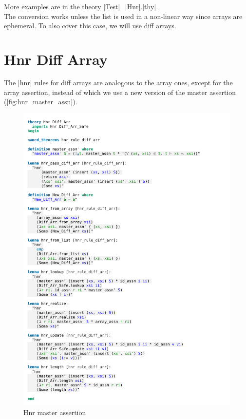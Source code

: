 \noindent More examples are in the theory |Test|\_|Hnr|.|thy|. \\
The conversion works unless the list is used in a non-linear way since arrays are ephemeral. To also cover this case, we will use diff arrays. 

\section{Hnr Diff Array}\label{section:hnr_diff_arr}

The |hnr| rules for diff arrays are analogous to the array ones, except for the array assertion, instead of which we use a new version of the master assertion (\autoref{fig:hnr_master_assn}). 

\begin{figure}[htpb]
    \includegraphics[trim={0 25,4cm 0 3,4cm}, clip, width=1.00\textwidth]{figures/Theory_Hnr_Diff_Arr.pdf}
    \caption[Hnr master assertion]{Hnr master assertion}
    \label{fig:hnr_master_assn}
\end{figure}

